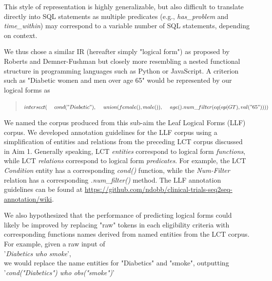 \documentclass[../main.tex]{subfiles}
\begin{document}
\noindent This style of representation is highly generalizable, but also difficult to translate directly into SQL statements as multiple predicates (e.g., \textit{has\_problem} and \textit{time\_within}) may correspond to a variable number of SQL statements, depending on context.

We thus chose a similar IR (hereafter simply "logical form") as proposed by Roberts and Demner-Fushman but closely more resembling a nested functional structure in programming languages such as Python or JavaScript. A criterion such as "Diabetic women and men over age 65" would be represented by our logical forms as

\begin{quote}
$intersect( \\
    \mathrm{\ \ \ \ }cond("Diabetic"), \\
    \mathrm{\ \ \ \ }union(female(), male()),\\
    \mathrm{\ \ \ \ }age().num\_filter(eq(op(GT), val("65"))) \\
)$
\end{quote}

We named the corpus produced from this sub-aim the Leaf Logical Forms (LLF) corpus. We developed annotation guidelines for the LLF corpus using a simplification of entities and relations from the preceding LCT corpus discussed in Aim 1. Generally speaking, LCT \textit{entities} correspond to logical form \textit{functions}, while LCT \textit{relations} correspond to logical form \textit{predicates}. For example, the LCT \textit{Condition} entity has a corresponding \textit{cond()} function, while the \textit{Num-Filter} relation has a corresponding \textit{.num\_filter()} method. The LLF annotation guidelines can be found at \url{https://github.com/ndobb/clinical-trials-seq2seq-annotation/wiki}.

We also hypothesized that the performance of predicting logical forms could likely be improved by replacing "raw" tokens in each eligibility criteria with corresponding functions names derived from named entities from the LCT corpus. For example, given a raw input of \\

'\textit{Diabetics who smoke}', \\

\noindent we would replace the name entities for "Diabetics" and "smoke", outputting \\ 

'\textit{cond("Diabetics") who obs("smoke")}' \\
\end{document}
